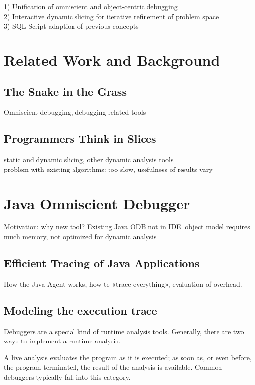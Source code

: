 \documentclass[english]{scrartcl}
\begin{document}
1) Unification of omniscient and object-centric debugging\\
2) Interactive dynamic slicing for iterative refinement of problem space\\
3) SQL Script adaption of previous concepts\\

\section{Related Work and Background}

\subsection{The Snake in the Grass}
Omniscient debugging, debugging related tools

\subsection{Programmers Think in Slices}
static and dynamic slicing, other dynamic analysis tools\\
problem with existing algorithms: too slow, usefulness of results vary

\section{Java Omniscient Debugger}
Motivation: why new tool?
Existing Java ODB not in IDE, object model requires much memory, not optimized for dynamic analysis

\subsection{Efficient Tracing of Java Applications}
How the Java Agent works, how to «trace everything», evaluation of overhead.

\subsection{Modeling the execution trace}

Debuggers are a special kind of runtime analysis tools.
Generally, there are two ways to implement a runtime analysis.

A live analysis evaluates the program as it is executed; as soon as, or even before, the program terminated, the result of the analysis is available.
Common debuggers typically fall into this category.
\end{document}
